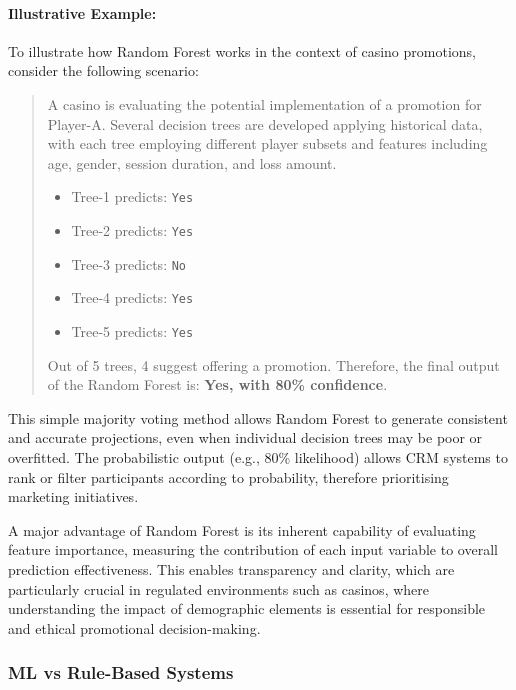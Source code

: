 \documentclass[12pt,a4paper]{report}
\begin{document}
\paragraph{Illustrative Example:}To illustrate how Random Forest works in the context of casino promotions, consider the following scenario:

\begin{quote}
    A casino is evaluating the potential implementation of a promotion for Player-A.  Several decision trees are developed applying historical data, with each tree employing different player subsets and features including age, gender, session duration, and loss amount.
    
    \begin{itemize}
        \item Tree-1 predicts: \texttt{Yes}
        \item Tree-2 predicts: \texttt{Yes}
        \item Tree-3 predicts: \texttt{No}
        \item Tree-4 predicts: \texttt{Yes}
        \item Tree-5 predicts: \texttt{Yes}
    \end{itemize}
    
    Out of 5 trees, 4 suggest offering a promotion. Therefore, the final output of the Random Forest is: \textbf{Yes, with 80\% confidence}.
\end{quote}

This simple majority voting method allows Random Forest to generate consistent and accurate projections, even when individual decision trees may be poor or overfitted.  The probabilistic output (e.g., 80\% likelihood) allows CRM systems to rank or filter participants according to probability, therefore prioritising marketing initiatives.

 A major advantage of Random Forest is its inherent capability of evaluating feature importance, measuring the contribution of each input variable to overall prediction effectiveness.   This enables transparency and clarity, which are particularly crucial in regulated environments such as casinos, where understanding the impact of demographic elements is essential for responsible and ethical promotional decision-making.


\subsubsection{ML vs Rule-Based Systems}
\end{document}
